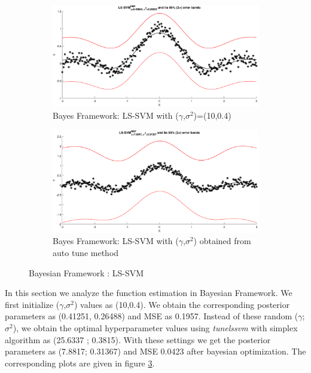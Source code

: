 \begin{figure}[ht]
	\centering
	\begin{subfigure}[b]{0.5\textwidth}
		\centering
		\captionsetup{width=0.7\linewidth}
		\includegraphics[height = 0.5\linewidth, width=0.8\linewidth]{Exercise2/Report/Bayesian_1.eps}
		\caption{Bayes Framework: LS-SVM with ($\gamma$,$\sigma^2$)=(10,0.4)}
		\label{fig:Bayesian_1}
	\end{subfigure}%
	\begin{subfigure}[b]{0.5\textwidth}
		\centering
		\captionsetup{width=0.7\linewidth}
		\includegraphics[height = 0.5\linewidth, width=0.8\linewidth]{Exercise2/Report/Bayesian_2.eps}
		\caption{Bayes Framework: LS-SVM with ($\gamma$,$\sigma^2$) obtained from auto tune method}
	\label{fig:Bayesian_2}
	\end{subfigure}

	\caption{Bayesian Framework : LS-SVM }	\label{fig:bayes_1}
\end{figure}
In this section we analyze the function estimation in Bayesian Framework. We first initialize ($\gamma$,$\sigma^2$) values as (10,0.4). We obtain the corresponding posterior parameters as (0.41251, 0.26488) and MSE as 0.1957.  Instead of these random ($\gamma$;$\sigma^2$), we obtain the optimal hyperparameter values using \textit{tunelssvm} with simplex algorithm as (25.6337 ; 0.3815). With these settings we get the posterior parameters as (7.8817; 0.31367) and MSE 0.0423 after bayesian optimization. The corresponding plots are given in figure \ref{fig:bayes_1}.

